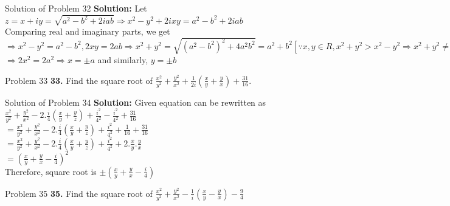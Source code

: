 \documentclass[aspectratio=169,8pt]{beamer}
\begin{document}
\begin{frame}{Solution of Problem 32}
  \textbf{Solution:} Let $z = x + iy = \sqrt{a^2 - b^2 + 2iab}\Rightarrow x^2 - y^2 + 2ixy = a^2 - b^2 + 2iab$\\
  \vspace*{0.2cm}
  Comparing real and imaginary parts, we get\\
  \vspace*{0.7cm}
  $\Rightarrow x^2 - y^2 = a^2 - b^2, 2xy = 2ab \Rightarrow x^2 + y^2 = \sqrt{(a^2 - b^2)^2 + 4a^2b^2} = a^2 + b^2[\because x,y \in R, x^2 + y^2 > x^2 - y^2 \Rightarrow x^2 + y^2 \neq -(a^2 + b^2)]$\\
  \vspace*{0.2cm}
  $\Rightarrow 2x^2 = 2a^2 \Rightarrow x = \pm a$ and similarly, $y = \pm b$
\end{frame}
\begin{frame}{Problem 33}
  \textbf{33.} Find the square root of $\frac{x^2}{y^2} + \frac{y^2}{x^2} + \frac{1}{2i}\left(\frac{x}{y} + \frac{y}{x}\right) + \frac{31}{16}.$
\end{frame}
\begin{frame}{Solution of Problem 34}
  \textbf{Solution:} Given equation can be rewritten as $\frac{x^2}{y^2} + \frac{y^2}{x^2} -2.\frac{i}{4}\left(\frac{x}{y} + \frac{y}{z}\right) + \frac{i^2}{4^2} - \frac{i^2}{4^2} + \frac{31}{16}$\\
  \vspace*{0.2cm}
  $= \frac{x^2}{y^2} + \frac{y^2}{x^2} -2.\frac{i}{4}\left(\frac{x}{y} + \frac{y}{z}\right) + \frac{i^2}{4^2} + \frac{1}{16} + \frac{31}{16}$\\
  \vspace*{0.2cm}
  $= \frac{x^2}{y^2} + \frac{y^2}{x^2} -2.\frac{i}{4}\left(\frac{x}{y} + \frac{y}{z}\right) + \frac{i^2}{4^2} + 2.\frac{x}{y}.\frac{y}{x}$\\
  \vspace*{0.2cm}
  $= \left(\frac{x}{y} + \frac{y}{x} - \frac{i}{4}\right)^2$\\
  \vspace*{0.2cm}
  Therefore, square root is $\pm\left(\frac{x}{y} + \frac{y}{x} - \frac{i}{4}\right)$
\end{frame}
\begin{frame}{Problem 35}
  \textbf{35.} Find the square root of $\frac{x^2}{y^2} + \frac{y^2}{x^2} - \frac{1}{i}\left(\frac{x}{y} - \frac{y}{x}\right) - \frac{9}{4}$
\end{frame}
\end{document}
